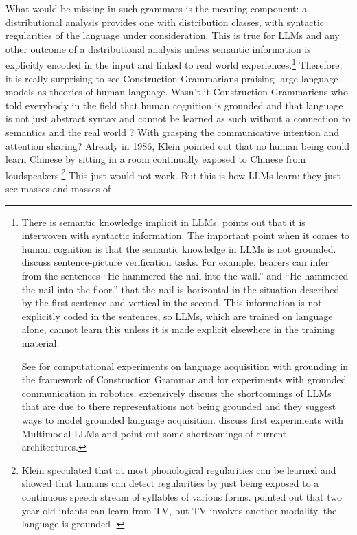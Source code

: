What would be missing in such grammars is the meaning component: a distributional analysis provides
one with distribution classes, with syntactic regularities of the language under consideration. This
is true for LLMs and any other outcome of a distributional analysis unless semantic information is
explicitly encoded in the input and linked to real world experiences.\footnote{%
  There is semantic knowledge implicit in LLMs. \citet[358]{Piantadosi2024a} points out that it is
  interwoven with syntactic information. The important point when it comes to human cognition is
  that the semantic knowledge in LLMs is not grounded. \citet[2]{JonesBergenTrott2024a} discuss
  sentence-picture verification tasks. For example, hearers can infer from the sentences ``He
  hammered the nail into the wall.'' and ``He hammered the nail into the floor.'' that the nail is
  horizontal in the situation described by the first sentence and vertical in the second. This
  information is not explicitly coded in the sentences, so LLMs, which are trained on language
  alone, cannot learn this unless it is made explicit elsewhere in the training material.

See \citet{CM2001a} for computational experiments on language
  acquisition with grounding in the framework of Construction Grammar and \citet{Steels2003a} for
  experiments with grounded communication in robotics. \citet{BeulsVanEcke2024a} extensively
  discuss the shortcomings of LLMs that are due to there representations not being grounded and they
  suggest ways to model grounded language acquisition. \citet{JonesBergenTrott2024a} discuss first
  experiments with Multimodal LLMs and point out some shortcomings of current architectures.%
}
Therefore, it is really surprising to see Construction Grammarians
praising large language models as theories of human language. Wasn't it Construction Grammariens who
told everybody in the field that human cognition is grounded
\citep{Barsalou2008a} and that language is not just abstract
syntax and cannot be learned as such without a connection to semantics and the real world
\parencites[44]{Klein86a-u}[113]{Tomasello2003a}[Section~4.2.3, 4.2.8]{AL2011a-u}? With grasping the communicative
intention and attention sharing? Already in 1986, Klein pointed out that no human being could learn
Chinese by sitting in a room continually exposed to Chinese from loudspeakers.\footnote{%
Klein speculated that at most phonological regularities can be learned and \citet{NHSA2004a} showed
that humans can detect regularities by just being exposed to a continuous speech stream
of syllables of various forms. \citet[44]{Sogaard2023a} pointed out that two year old infants can learn
from TV, but TV involves another modality, the language is grounded \citep{Rice1983a}.
} This just would not work. But this is how LLMs learn: they just see masses and masses of
